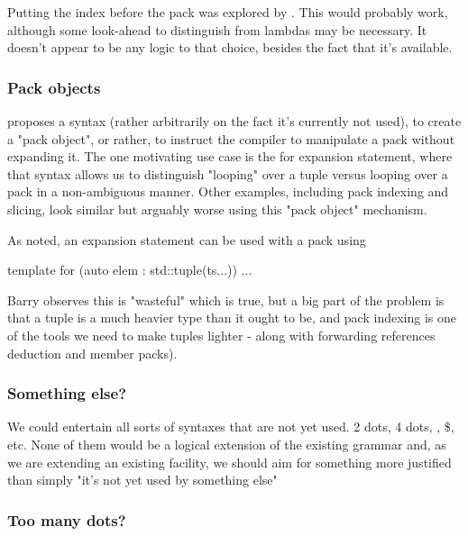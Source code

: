 \documentclass{wg21}
\begin{document}
Putting the index before the pack was explored by .
This would probably work, although some look-ahead to distinguish from lambdas may be necessary.
It doesn't appear to be any logic to that choice, besides the fact that it's available.

\subsubsection{Pack objects}

 proposes a syntax (rather arbitrarily on the fact it's currently not used), to create a "pack object", or rather, to instruct the compiler to manipulate
a pack without expanding it.
The one motivating use case is the for expansion statement, where that syntax allows us to distinguish "looping" over a tuple versus looping over a pack in a non-ambiguous manner.
Other examples, including pack indexing and slicing, look similar but arguably worse using this "pack object" mechanism.

As noted, an expansion statement can be used with a pack using

\begin{colorblock}
    template for (auto elem : std::tuple(ts...)) { ... }
\end{colorblock}


Barry observes this is "wasteful" which is true, but a big part of the problem is that a tuple is a much heavier type than it ought to be,
and pack indexing is one of the tools we need to make tuples lighter - along with forwarding references deduction and member packs).

\subsubsection{Something else?}

We could entertain all sorts of syntaxes that are not yet used. 2 dots, 4 dots, \tcode{!},  \$, etc.
None of them would be a logical extension of the existing grammar and, as we are extending an existing facility, we should aim for something more justified than simply "it's not yet used by something else"

\subsubsection{Too many dots?}
\end{document}
